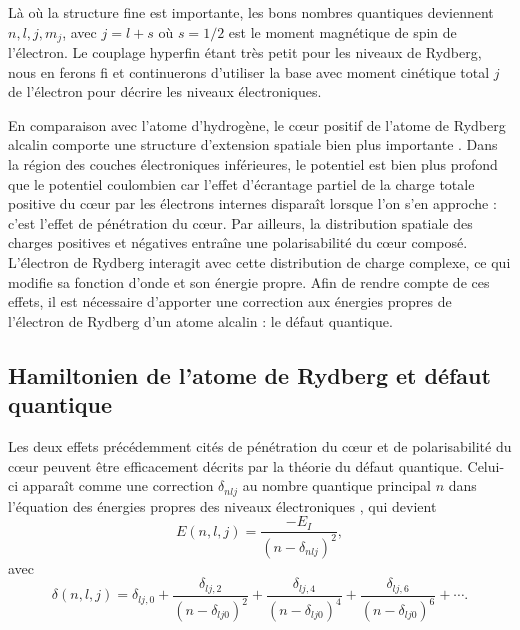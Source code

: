 Là où la structure fine est importante, les bons nombres quantiques deviennent $n,l,j,m_j$, avec $j=l+s$ où $s=1/2$ est le moment magnétique de spin de l'électron. Le couplage hyperfin étant très petit pour les niveaux de Rydberg, nous en ferons fi et continuerons d'utiliser la base avec moment cinétique total $j$ de l'électron pour décrire les niveaux électroniques.

En comparaison avec l'atome d'hydrogène, le c\oe ur positif de l'atome de Rydberg alcalin comporte une structure d'extension spatiale bien plus importante \cite{TXT_GALLAGHER}.
Dans la région des couches électroniques inférieures, le potentiel est bien plus profond que le potentiel coulombien car l'effet d'écrantage partiel de la charge totale positive du c\oe ur par les électrons internes disparaît lorsque l'on s'en approche : c'est l'effet de pénétration du c\oe ur.
Par ailleurs, la distribution spatiale des charges positives et négatives entraîne une polarisabilité du c\oe ur composé.
L'électron de Rydberg interagit avec cette distribution de charge complexe, ce qui modifie sa fonction d'onde et son énergie propre.
Afin de rendre compte de ces effets, il est nécessaire d'apporter une correction aux énergies propres de l'électron de Rydberg d'un atome alcalin : le défaut quantique.

	\subsection{Hamiltonien de l'atome de Rydberg et défaut quantique}
\noindent Les deux effets précédemment cités de pénétration du c\oe ur et de polarisabilité du c\oe ur peuvent être efficacement décrits par la théorie du défaut quantique. Celui-ci apparaît comme une correction $\delta_{nlj}$ au nombre quantique principal $n$ dans l'équation des énergies propres des niveaux électroniques \cite{TXT_GALLAGHER}, qui devient
\begin{equation}\label{eq:E_I_delta}
E(n,l,j) = \frac{- E_I}{(n-\delta_{nlj})^2} ,
\end{equation}
avec 
\begin{equation}\label{eq:deltanlj}
\delta(n,l,j)=\delta_{lj,0} + \frac{\delta_{lj,2}}{(n-\delta_{lj0})^2} + \frac{\delta_{lj,4}}{(n-\delta_{lj0})^4} + \frac{\delta_{lj,6}}{(n-\delta_{lj0})^6} + \cdots .
\end{equation}

